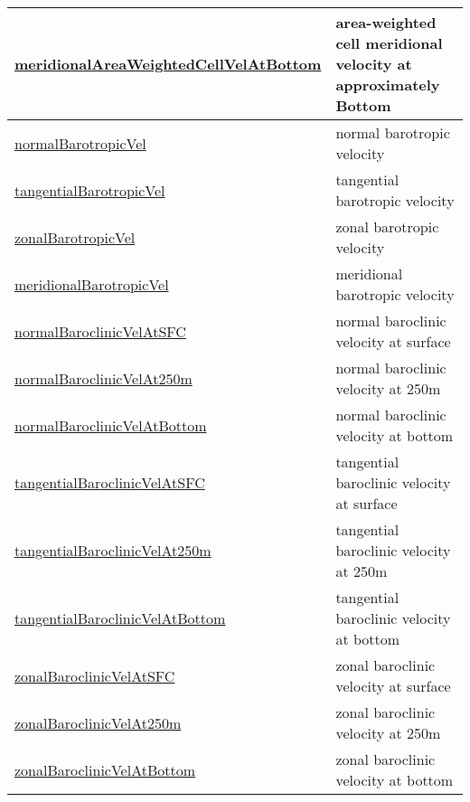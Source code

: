 {\begin{center}
\begin{longtable}{| p{2.0in} | p{4.0in} |}
    \hline
    \hyperref[subsec:var_sec_highFrequencyOutputAM_meridionalAreaWeightedCellVelAtBottom]{meridionalAreaWeightedCellVel\-AtBottom} & area-weighted cell meridional velocity at approximately Bottom \\
    \hline
    \hyperref[subsec:var_sec_highFrequencyOutputAM_normalBarotropicVel]{normalBarotropicVel} & normal barotropic velocity \\
    \hline
    \hyperref[subsec:var_sec_highFrequencyOutputAM_tangentialBarotropicVel]{tangentialBarotropicVel} & tangential barotropic velocity \\
    \hline
    \hyperref[subsec:var_sec_highFrequencyOutputAM_zonalBarotropicVel]{zonalBarotropicVel} & zonal barotropic velocity \\
    \hline
    \hyperref[subsec:var_sec_highFrequencyOutputAM_meridionalBarotropicVel]{meridionalBarotropicVel} & meridional barotropic velocity \\
    \hline
    \hyperref[subsec:var_sec_highFrequencyOutputAM_normalBaroclinicVelAtSFC]{normalBaroclinicVelAtSFC} & normal baroclinic velocity at surface \\
    \hline
    \hyperref[subsec:var_sec_highFrequencyOutputAM_normalBaroclinicVelAt250m]{normalBaroclinicVelAt250m} & normal baroclinic velocity at 250m \\
    \hline
    \hyperref[subsec:var_sec_highFrequencyOutputAM_normalBaroclinicVelAtBottom]{normalBaroclinicVelAtBottom} & normal baroclinic velocity at bottom \\
    \hline
    \hyperref[subsec:var_sec_highFrequencyOutputAM_tangentialBaroclinicVelAtSFC]{tangentialBaroclinicVelAtSFC} & tangential baroclinic velocity at surface \\
    \hline
    \hyperref[subsec:var_sec_highFrequencyOutputAM_tangentialBaroclinicVelAt250m]{tangentialBaroclinicVelAt250m} & tangential baroclinic velocity at 250m \\
    \hline
    \hyperref[subsec:var_sec_highFrequencyOutputAM_tangentialBaroclinicVelAtBottom]{tangentialBaroclinicVelAtBottom} & tangential baroclinic velocity at bottom \\
    \hline
    \hyperref[subsec:var_sec_highFrequencyOutputAM_zonalBaroclinicVelAtSFC]{zonalBaroclinicVelAtSFC} & zonal baroclinic velocity at surface \\
    \hline
    \hyperref[subsec:var_sec_highFrequencyOutputAM_zonalBaroclinicVelAt250m]{zonalBaroclinicVelAt250m} & zonal baroclinic velocity at 250m \\
    \hline
    \hyperref[subsec:var_sec_highFrequencyOutputAM_zonalBaroclinicVelAtBottom]{zonalBaroclinicVelAtBottom} & zonal baroclinic velocity at bottom \\

\end{longtable}
\end{center}}
